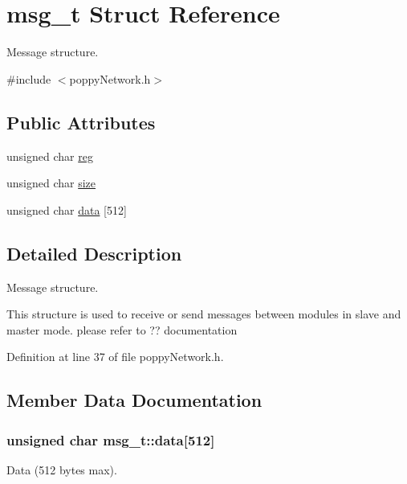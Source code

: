 \hypertarget{structmsg__t}{\section{msg\-\_\-t \-Struct \-Reference}
\label{structmsg__t}
}


\-Message structure.  




{\ttfamily \#include $<$poppy\-Network.\-h$>$}

\subsection*{\-Public \-Attributes}
\begin{DoxyCompactItemize}
\item 
unsigned char \hyperlink{structmsg__t_a0aef01fbaf575c639d82d5beee92c421}{reg}
\item 
unsigned char \hyperlink{structmsg__t_a3736f2ca203e665223b225ca07def9b5}{size}
\item 
unsigned char \hyperlink{structmsg__t_ab11ea949abe5142d3e5c5911cf971860}{data} \mbox{[}512\mbox{]}
\end{DoxyCompactItemize}


\subsection{\-Detailed \-Description}
\-Message structure. 

\-This structure is used to receive or send messages between modules in slave and master mode. please refer to ?? documentation 

\-Definition at line 37 of file poppy\-Network.\-h.



\subsection{\-Member \-Data \-Documentation}
\hypertarget{structmsg__t_ab11ea949abe5142d3e5c5911cf971860}{
\subsubsection[{data}]{\setlength{\rightskip}{0pt plus 5cm}unsigned char {\bf msg\-\_\-t\-::data}\mbox{[}512\mbox{]}}}\label{structmsg__t_ab11ea949abe5142d3e5c5911cf971860}
\-Data (512 bytes max). 

